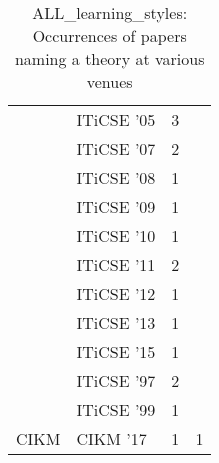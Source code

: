\begin{table*}[t]
\begin{tabular}{llrr}
& ITiCSE '05 & 3 &\\
& ITiCSE '07 & 2 &\\
& ITiCSE '08 & 1 &\\
& ITiCSE '09 & 1 &\\
& ITiCSE '10 & 1 &\\
& ITiCSE '11 & 2 &\\
& ITiCSE '12 & 1 &\\
& ITiCSE '13 & 1 &\\
& ITiCSE '15 & 1 &\\
& ITiCSE '97 & 2 &\\
& ITiCSE '99 & 1 &\\
\multirow{1}{*}{CIKM } & CIKM '17 & 1 & \multirow{1}{*}{1}\\
\end{tabular}
\caption{ALL\_learning\_styles: Occurrences of papers naming a theory at various venues}
\end{table*}